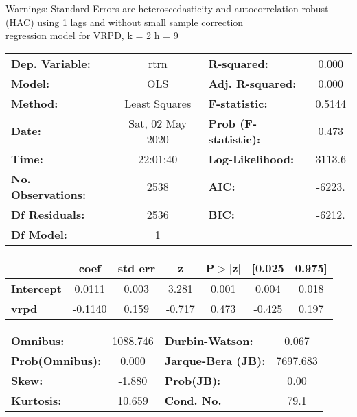 Warnings: \newline
 [1] Standard Errors are heteroscedasticity and autocorrelation robust (HAC) using 1 lags and without small sample correction\\ 

regression model for VRPD, k = 2 h = 9\begin{center}
\begin{tabular}{lclc}
\toprule
\textbf{Dep. Variable:}    &       rtrn       & \textbf{  R-squared:         } &     0.000   \\
\textbf{Model:}            &       OLS        & \textbf{  Adj. R-squared:    } &     0.000   \\
\textbf{Method:}           &  Least Squares   & \textbf{  F-statistic:       } &    0.5144   \\
\textbf{Date:}             & Sat, 02 May 2020 & \textbf{  Prob (F-statistic):} &    0.473    \\
\textbf{Time:}             &     22:01:40     & \textbf{  Log-Likelihood:    } &    3113.6   \\
\textbf{No. Observations:} &        2538      & \textbf{  AIC:               } &    -6223.   \\
\textbf{Df Residuals:}     &        2536      & \textbf{  BIC:               } &    -6212.   \\
\textbf{Df Model:}         &           1      & \textbf{                     } &             \\
\bottomrule
\end{tabular}
\begin{tabular}{lcccccc}
                   & \textbf{coef} & \textbf{std err} & \textbf{z} & \textbf{P$> |$z$|$} & \textbf{[0.025} & \textbf{0.975]}  \\
\midrule
\textbf{Intercept} &       0.0111  &        0.003     &     3.281  &         0.001        &        0.004    &        0.018     \\
\textbf{vrpd}      &      -0.1140  &        0.159     &    -0.717  &         0.473        &       -0.425    &        0.197     \\
\bottomrule
\end{tabular}
\begin{tabular}{lclc}
\textbf{Omnibus:}       & 1088.746 & \textbf{  Durbin-Watson:     } &    0.067  \\
\textbf{Prob(Omnibus):} &   0.000  & \textbf{  Jarque-Bera (JB):  } & 7697.683  \\
\textbf{Skew:}          &  -1.880  & \textbf{  Prob(JB):          } &     0.00  \\
\textbf{Kurtosis:}      &  10.659  & \textbf{  Cond. No.          } &     79.1  \\
\bottomrule
\end{tabular}
\end{center}

